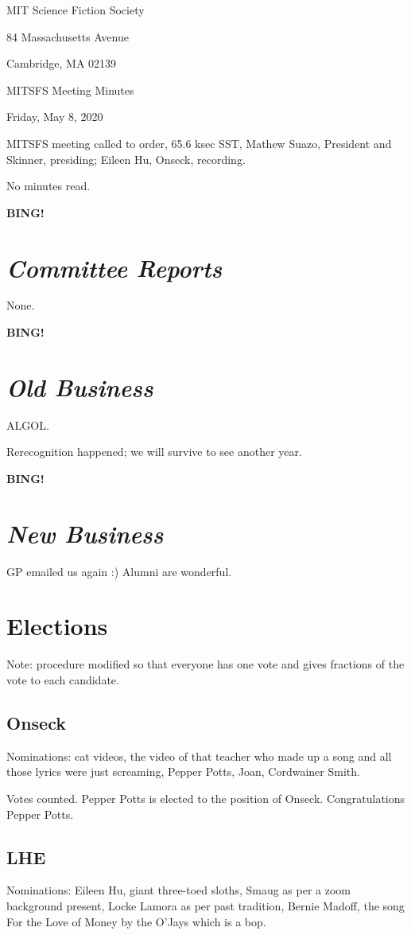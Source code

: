 \documentclass[10pt]{article}
\newcommand{\bing}{{\bf BING!} }
\newcommand{\goto}[1]{\bing \vskip 12pt \section*{{\em{#1}}}}
\newcommand{\skinner}{Mathew Suazo, President and Skinner\xspace}
\newcommand{\onseck}{Eileen Hu, Onseck\xspace}
\newcommand{\meetingdate}{Friday, May 8, 2020}
\begin{document}
\begin{center}

MIT Science Fiction Society

84 Massachusetts Avenue

Cambridge, MA 02139

\vspace{12pt}

MITSFS Meeting Minutes

\meetingdate

\end{center}

\vspace{18pt}

\setlength{\parskip}{6pt}

\noindent
MITSFS meeting called to order, 65.6 ksec SST,
\skinner, presiding; \onseck, recording.

No minutes read.

\goto{Committee Reports}

None.

\goto{Old Business}

ALGOL.

Rerecognition happened; we will survive to see another year.

\goto{New Business}

GP emailed us again :) Alumni are wonderful.

\section{Elections}

Note: procedure modified so that everyone has one vote and gives fractions of the vote to each candidate.

\subsection{Onseck}

Nominations: cat videos, the video of that teacher who made up a song and all those lyrics were just screaming, Pepper Potts, Joan, Cordwainer Smith.

Votes counted. Pepper Potts is elected to the position of Onseck. Congratulations Pepper Potts.

\subsection{LHE}

Nominations: Eileen Hu, giant three-toed sloths, Smaug as per a zoom background present, Locke Lamora as per past tradition, Bernie Madoff, the song For the Love of Money by the O'Jays which is a bop.
\end{document}
